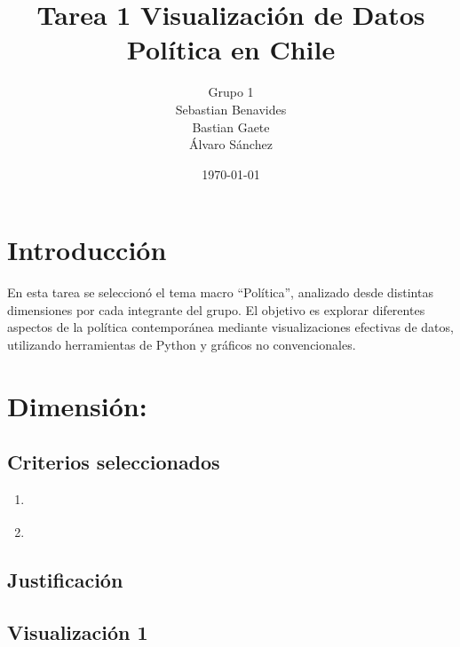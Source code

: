 \documentclass[12pt]{article}
\title{Tarea 1 \- Visualización de Datos\\\large Política en Chile}
\author{Grupo 1\\Sebastian Benavides\\ Bastian Gaete\\ Álvaro Sánchez\\}
\date{\today}
\begin{document}
\maketitle

\section*{Introducción}

En esta tarea se seleccionó el tema macro “Política”, analizado desde distintas dimensiones por cada integrante del grupo. El objetivo es explorar diferentes aspectos de la política contemporánea mediante visualizaciones efectivas de datos, utilizando herramientas de Python y gráficos no convencionales.


\section*{Dimensión: %
}

\subsection*{Criterios seleccionados}
\begin{enumerate}
    \item \textbf{%
    }
    \item \textbf{%
    }
\end{enumerate}

\subsection*{Justificación}

\subsection*{Visualización 1}
\end{document}
